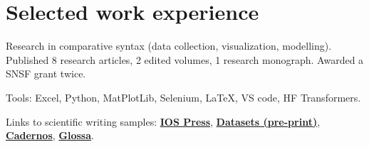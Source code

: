 \documentclass[]{plushcv}
\begin{document}
\begin{minipage}[t]{0.70\textwidth} 



\section{Selected work experience}


Research in comparative syntax (data collection, visualization, modelling). Published 8 research articles, 2 edited volumes, 1 research monograph. Awarded a SNSF grant twice.
\sectionsep
\vspace*{2mm}
\begin{tightemize}
\item Tools: Excel, Python, MatPlotLib, Selenium, LaTeX, VS code, HF Transformers.
\item Links to scientific writing samples: \href{https://ebooks.iospress.nl/doi/10.3233/SHTI220702}{\textbf{IOS Press}}, \href{https://github.com/CaterinaBi/health-communication-paper2/blob/main/paper2023/first-submission/BonanSamo2023.pdf}{\textbf{Datasets (pre-print)}}, \href{https://periodicos.unb.br/index.php/cs/article/view/40559/33149}{\textbf{Cadernos}}, \href{https://doi.org/10.16995/glossa.5714}{\textbf{Glossa}}.
\end{tightemize}
\sectionsep


\end{minipage}
\end{document}
